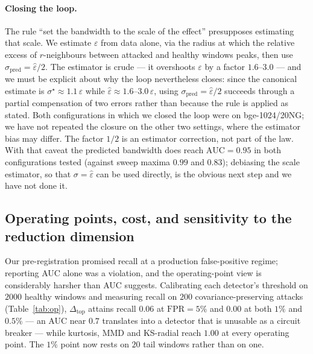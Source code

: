 \documentclass[11pt]{article}
\theoremstyle{remark}
\begin{document}
\paragraph{Closing the loop.} The rule ``set the bandwidth to the scale of the effect'' presupposes
estimating that scale. We estimate $\varepsilon$ from data alone, via the radius at which the
relative excess of $r$-neighbours between attacked and healthy windows peaks, then use
$\sigma_{\mathrm{pred}}=\hat\varepsilon/2$. The estimator is crude --- it overshoots $\varepsilon$ by a factor $1.6$--$3.0$ --- and we must be
explicit about why the loop nevertheless closes: since the canonical estimate is
$\sigma^\star\approx1.1\,\varepsilon$ while $\hat\varepsilon\approx1.6$--$3.0\,\varepsilon$, using
$\sigma_{\mathrm{pred}}=\hat\varepsilon/2$ succeeds through a partial compensation of two errors
rather than because the rule is applied as stated. Both configurations in which we closed the loop
were on bge-1024/20NG; we have not repeated the closure on the other two settings, where the
estimator bias may differ. The factor
$1/2$ is an estimator correction, not part of the law. With that caveat the predicted bandwidth
does reach $\mathrm{AUC}=0.95$ in both configurations tested (against sweep maxima $0.99$ and
$0.83$); debiasing the scale estimator, so that $\sigma=\hat\varepsilon$ can be used directly, is
the obvious next step and we have not done it.

\subsection{Operating points, cost, and sensitivity to the reduction dimension}\label{sec:op}
Our pre-registration promised recall at a production false-positive regime; reporting AUC alone
was a violation, and the operating-point view is considerably harsher than AUC suggests. Calibrating
each detector's threshold on $2000$ healthy windows and measuring recall on $200$
covariance-preserving attacks (Table~\ref{tab:op}), $\Delta_{\mathrm{top}}$ attains recall $0.06$
at $\mathrm{FPR}=5\%$ and $0.00$ at both $1\%$ and $0.5\%$ --- an AUC near $0.7$ translates into a
detector that is unusable as a circuit breaker --- while kurtosis, MMD and KS-radial reach $1.00$
at every operating point. The $1\%$ point now rests on $20$ tail windows rather than on one.
\end{document}
